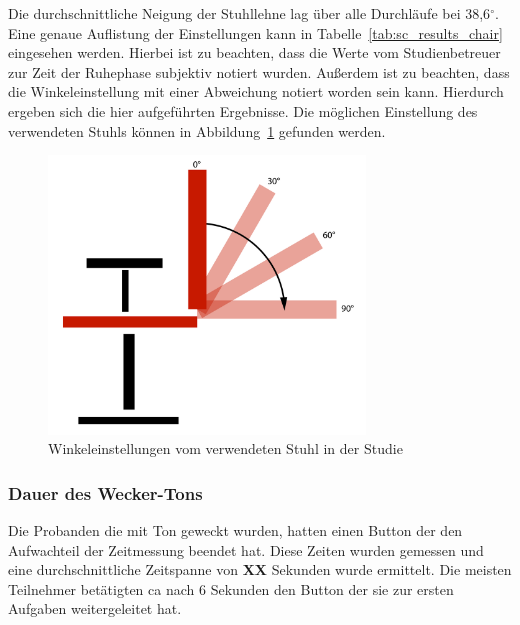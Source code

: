 Die durchschnittliche Neigung der Stuhllehne lag über alle Durchläufe bei 38,6$^\circ$. Eine genaue Auflistung der Einstellungen kann in Tabelle~\ref{tab:sc_results_chair} eingesehen werden. Hierbei ist zu beachten, dass die Werte vom Studienbetreuer zur Zeit der Ruhephase subjektiv notiert wurden. Außerdem ist zu beachten, dass die Winkeleinstellung mit einer Abweichung notiert worden sein kann. Hierdurch ergeben sich die hier aufgeführten Ergebnisse. Die möglichen Einstellung des verwendeten Stuhls können in Abbildung~\ref{fig:chair_backrest} gefunden werden.

\begin{figure}[H]
	\centering
	\includegraphics[width=0.75\textwidth]{./images/chair}
	\caption{Winkeleinstellungen vom verwendeten Stuhl in der Studie}
	\label{fig:chair_backrest}
\end{figure}


\subsubsection{Dauer des Wecker-Tons}

Die Probanden die mit Ton geweckt wurden, hatten einen Button der den Aufwachteil der Zeitmessung beendet hat. Diese Zeiten wurden gemessen und eine durchschnittliche Zeitspanne von \textbf{XX} Sekunden wurde ermittelt. Die meisten Teilnehmer betätigten ca nach 6 Sekunden den Button der sie zur ersten Aufgaben weitergeleitet hat. 

